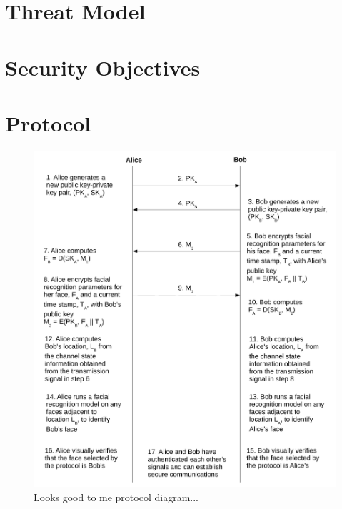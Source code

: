 \documentclass[12pt]{report}
\begin{document}
\section{Threat Model}

\section{Security Objectives}

\section{Protocol}

\begin{figure}
\center
\includegraphics[scale=0.6]{../figures/looks-good-to-me-protocol-diagram--no-legend.pdf}
\caption{Looks good to me protocol diagram...}
\label{protocol-diagram}
\end{figure}
\end{document}
